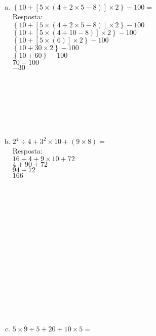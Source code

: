 \documentclass[a4paper,14pt]{article}
\begin{document}
\begin{multicols}{2}
\begin{enumerate}
\begin{enumerate}[a)]
				\item $\left\{10 + [5 \times (4 + 2 \times 5 - 8)] \times 2 \right\} - 100 = $ \\
				
				Resposta: \\
				
				$\left\{10 + [5 \times (4 + 2 \times 5 - 8)] \times 2 \right\} - 100$ \\
				$\left\{10 + [5 \times (4 + 10 - 8)] \times 2 \right\} - 100$ \\
				$\left\{10 + [5 \times (6)] \times 2 \right\} - 100$ \\
				$\left\{10 + 30 \times 2 \right\} - 100$ \\
				$\left\{10 + 60 \right\} - 100$ \\
				$70 - 100$ \\
				$-30$ \\\\\\\\\\\\\\
				
				\fontsize{14}{\baselineskip} \selectfont
				
				\item $2^4 \div 4 + 3^2 \times 10 + (9 \times 8) = $ \\
				
				Resposta: \\
				
				$16 \div 4 + 9 \times 10 + 72$ \\
				$4 + 90 + 72$ \\
				$94 + 72$ \\
				$166$ \\\\\\\\\\\\\\\\\\\\\\\\\\\\\\
				
				
				\item $5 \times 9 \div 5 + 20 \div 10 \times 5 = $ \\
				

\end{enumerate}
\end{enumerate}
\end{multicols}
\end{document}
